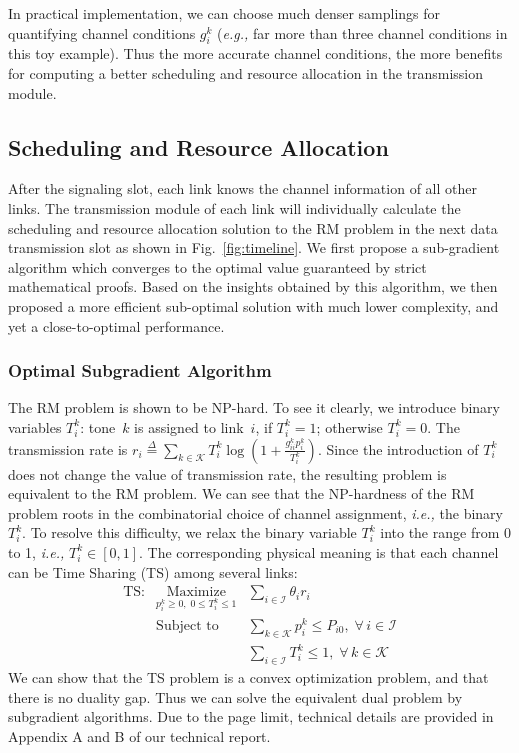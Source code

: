 \documentclass[conference]{IEEEtran}
\newcommand{\mdef}{\overset{\Delta}{=}}
\newcommand{\ie}{\emph{i.e., }}
\newcommand{\eg}{\emph{e.g., }}
\newcommand{\mi}{\mathcal{I}}
\newcommand{\mk}{\mathcal{K}}
\begin{document}
In practical implementation, we can choose much denser samplings for quantifying channel conditions $g_i^k$ (\eg far more than three channel conditions in this toy example). Thus the more accurate channel conditions, the more benefits for computing a better scheduling and resource allocation in the transmission module.



\subsection{Scheduling and Resource Allocation}
\label{sec:scheduling}
After the signaling slot, each link knows the channel information of all other links. The transmission module of each link will individually calculate the scheduling and resource allocation solution to the RM problem in the next data transmission slot as shown in Fig.~\ref{fig:timeline}. We first propose a sub-gradient algorithm which converges to the optimal value guaranteed by strict mathematical proofs. Based on the insights obtained by this algorithm, we then proposed a more efficient sub-optimal solution with much lower complexity, and yet a close-to-optimal performance.


\subsubsection{Optimal Subgradient Algorithm}
\label{sec:opt-algorithm}
The RM problem is shown to be NP-hard. To see it clearly, we introduce binary variables $T_i^k$: tone~$k$ is assigned to link~$i$, if $T_i^k=1$; otherwise $T_i^k=0$. The transmission rate is
$   r_i\mdef\sum_{k\in\mathcal{K}}T_i^k\log\left(1+\frac{g_{ii}^kp_i^k}{T_i^k}\right).
$
Since the introduction of $T_i^k$ does not change the value of transmission rate, the resulting problem is equivalent to the RM problem. We can see that the NP-hardness of the RM problem roots in the combinatorial choice of channel assignment, \ie the binary $T_i^k$.
To resolve this difficulty, we relax the binary variable $T_i^k$ into the range from 0 to 1, \ie $T_i^k\in [0,1]$. The corresponding physical meaning is that each channel can be Time Sharing (TS) among several links:
\begin{eqnarray}
\text{TS:}&\underset{p_i^k\ge 0,\; 0\le T_i^k\le 1}{\text{Maximize}}&\sum_{i\in \mathcal{I}} \theta_ir_i \nonumber\\
&\text{Subject to}& \sum_{k\in\mathcal{K}}p_i^k\le P_{i0},\;\forall\, i\in\mi \label{eq:power_con_ts}\\
&& \sum_{i\in\mathcal{I}}T_i^k\le 1,\;\forall\, k\in\mk \label{eq:time_con}
\end{eqnarray}
We can show that the TS problem is a convex optimization problem, and that there is no duality gap.  Thus we can solve the equivalent dual problem by subgradient algorithms\cite{Bertsekas1999nonlinear}. Due to the page limit, technical details are provided in Appendix A and B of our technical report.
\end{document}
